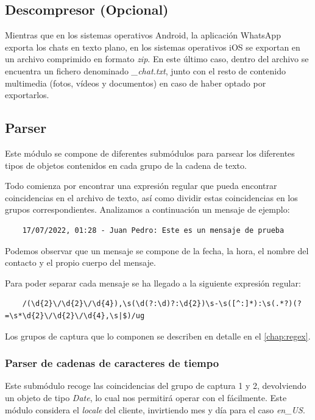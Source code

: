 \subsection{Descompresor (Opcional)}

Mientras que en los sistemas operativos Android, la aplicación WhatsApp exporta los chats en texto plano, en los sistemas operativos iOS se exportan en un archivo comprimido en formato \textit{zip}. En este último caso, dentro del archivo se encuentra un fichero denominado \textit{\_chat.txt}, junto con el resto de contenido multimedia (fotos, vídeos y documentos) en caso de haber optado por exportarlos.

\subsection{Parser}

Este módulo se compone de diferentes submódulos para parsear los diferentes tipos de objetos contenidos en cada grupo de la cadena de texto.

Todo comienza por encontrar una expresión regular que pueda encontrar coincidencias en el archivo de texto, así como dividir estas coincidencias en los grupos correspondientes. Analizamos a continuación un mensaje de ejemplo:

\begin{lstlisting}
	17/07/2022, 01:28 - Juan Pedro: Este es un mensaje de prueba
\end{lstlisting}

Podemos observar que un mensaje se compone de la fecha, la hora, el nombre del contacto y el propio cuerpo del mensaje.

Para poder separar cada mensaje se ha llegado a la siguiente expresión regular:

\begin{lstlisting}
	/(\d{2}\/\d{2}\/\d{4}),\s(\d(?:\d)?:\d{2})\s-\s([^:]*):\s(.*?)(?=\s*\d{2}\/\d{2}\/\d{4},\s|$)/ug
\end{lstlisting}

Los grupos de captura que lo componen se describen en detalle en el \autoref{chap:regex}.


\subsubsection{Parser de cadenas de caracteres de tiempo}

Este submódulo recoge las coincidencias del grupo de captura 1 y 2, devolviendo un objeto de tipo \textit{Date}, lo cual nos permitirá operar con el fácilmente. Este módulo considera el \textit{locale} del cliente, invirtiendo mes y día para el caso \textit{en\_US}.


